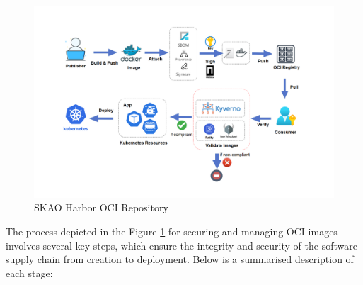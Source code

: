 \documentclass[a4paper]{spie}  %
\begin{document}
   \begin{figure} [ht]
   \begin{center}
   \includegraphics[width=\textwidth,height=\textheight,keepaspectratio]{e2e-workflow.png}
   \end{center}
   \caption 
   { \label{fig:chain}
SKAO Harbor OCI Repository}
    \end{figure} 

The process depicted in the Figure \ref{fig:chain} for securing and managing OCI images involves several key steps, which ensure the integrity and security of the software supply chain from creation to deployment. Below is a summarised description of each stage:
\end{document}

